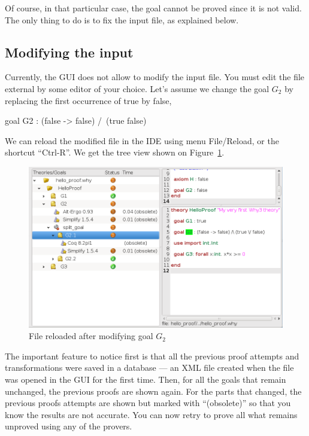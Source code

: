 Of course, in that particular case, the goal cannot be proved since it
is not valid. The only thing to do is to fix the input file, as
explained below.

\subsection{Modifying the input}

Currently, the GUI does not allow to modify the input file. You must
edit the file external by some editor of your choice. Let's assume we
change the goal $G_2$ by replacing the first occurrence of true by
false, \eg
\begin{whycode}
  goal G2 : (false -> false) /\ (true \/ false)
\end{whycode}
We can reload the modified file in the IDE using menu \textsf{File/Reload}, or the shortcut ``Ctrl-R''. We get the tree view shown on Figure~\ref{fig:gui5}.

\begin{figure}[tbp]
  \includegraphics[width=\textwidth]{gui-0-70-5.png}
  \caption{File reloaded after modifying goal $G_2$}
  \label{fig:gui5}
\end{figure}

The important feature to notice first is that all the previous proof
attempts and transformations were saved in a database --- an XML file
created when the \why file was opened in the GUI for the first
time. Then, for all the goals that remain unchanged, the previous
proofs are shown again. For the parts that changed, the previous
proofs attempts are shown but marked with ``(obsolete)''
so that you
know the results are not accurate. You can now retry to prove all what
remains unproved using any of the provers.

